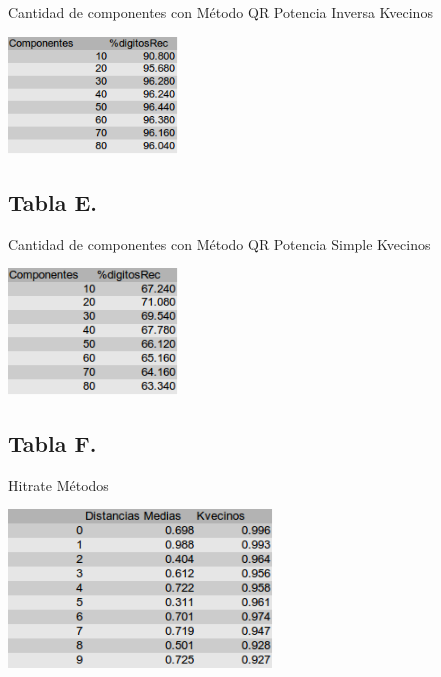 	Cantidad de componentes con M\'etodo QR Potencia Inversa Kvecinos

	\vspace{5mm}
	\centerline{\includegraphics[width=4.5cm]{img/QrKvecinos.png}}


\subsection{Tabla E.}
	
	Cantidad de componentes con M\'etodo QR Potencia Simple Kvecinos

	\vspace{5mm}
	\centerline{\includegraphics[width=4.5cm]{img/QRDigitosMEdios.png}}

\subsection{Tabla F.}
	
	Hitrate M\'etodos

	\vspace{5mm}
	\centerline{\includegraphics[width=7cm]{img/digitosBam_tabla.png}}

